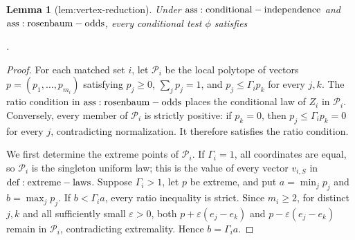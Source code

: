 \documentclass{article}
\newtheorem{lemma}{Lemma}
\begin{document}
\begin{lemma}[lem:vertex-reduction]\label{lem:vertex-reduction}
Under \({\rm ass:conditional-independence}\) and \({\rm ass:rosenbaum-odds}\), every conditional test \(\phi\) satisfies \par\noindent {}\par\noindent.
\end{lemma}
\begin{proof}
For each matched set \(i\), let \(\mathcal P_i\) be the local polytope of vectors \(p=(p_1,\ldots,p_{m_i})\) satisfying \(p_j\geq0\), \(\sum_jp_j=1\), and \(p_j\leq\Gamma_i p_k\) for every \(j,k\). The ratio condition in \({\rm ass:rosenbaum-odds}\) places the conditional law of \(Z_i\) in \(\mathcal P_i\). Conversely, every member of \(\mathcal P_i\) is strictly positive: if \(p_k=0\), then \(p_j\leq\Gamma_i p_k=0\) for every \(j\), contradicting normalization. It therefore satisfies the ratio condition.

We first determine the extreme points of \(\mathcal P_i\). If \(\Gamma_i=1\), all coordinates are equal, so \(\mathcal P_i\) is the singleton uniform law; this is the value of every vector \(v_{i,S}\) in \({\rm def:extreme-laws}\). Suppose \(\Gamma_i>1\), let \(p\) be extreme, and put \(a=\min_jp_j\) and \(b=\max_jp_j\). If \(b<\Gamma_i a\), every ratio inequality is strict. Since \(m_i\geq2\), for distinct \(j,k\) and all sufficiently small \(\varepsilon>0\), both \(p+\varepsilon(e_j-e_k)\) and \(p-\varepsilon(e_j-e_k)\) remain in \(\mathcal P_i\), contradicting extremality. Hence \(b=\Gamma_i a\).


\end{proof}
\end{document}
